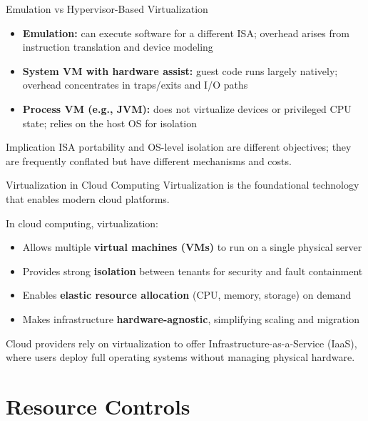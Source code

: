 \begin{frame}{Emulation vs Hypervisor-Based Virtualization}
  \begin{itemize}
    \item \textbf{Emulation:} can execute software for a different ISA; overhead arises from instruction translation and device modeling
    \item \textbf{System VM with hardware assist:} guest code runs largely natively; overhead concentrates in traps/exits and I/O paths
    \item \textbf{Process VM (e.g., JVM):} does not virtualize devices or privileged CPU state; relies on the host OS for isolation
  \end{itemize}

  \vspace{0.4em}
  \begin{block}{Implication}
    ISA portability and OS-level isolation are different objectives; they are frequently conflated but have different mechanisms and costs.
  \end{block}
\end{frame}

\begin{frame}{Virtualization in Cloud Computing}
  Virtualization is the foundational technology that enables modern cloud platforms.

  \medskip
  In cloud computing, virtualization:
  \begin{itemize}
    \item Allows multiple \textbf{virtual machines (VMs)} to run on a single physical server
    \item Provides strong \textbf{isolation} between tenants for security and fault containment
    \item Enables \textbf{elastic resource allocation} (CPU, memory, storage) on demand
    \item Makes infrastructure \textbf{hardware-agnostic}, simplifying scaling and migration
  \end{itemize}

  \medskip
  Cloud providers rely on virtualization to offer Infrastructure-as-a-Service (IaaS), where users deploy full operating systems without managing physical hardware.
\end{frame}

\section{Resource Controls}
